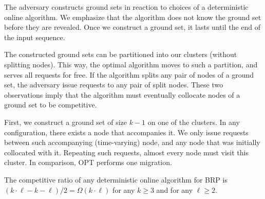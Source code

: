 \documentclass[manuscript,screen=true, review, anonymous]{acmart}
\newcommand{\OPT}{\textsf{OPT}\xspace}
\newcommand{\OBRP}{BRP}
\begin{document}
The adversary constructs ground sets in reaction to choices of a deterministic online algorithm.
We emphasize that the algorithm does not know the ground set before they are revealed.
Once we construct a ground set, it lasts until the end of the input sequence.

The constructed ground sets can be partitioned into our clusters (without splitting nodes).
This way, the optimal algorithm moves to such a partition, and serves all requests for free.
If the algorithm splits any pair of nodes of a ground set, the adversary issue requests to any pair of split nodes.
These two observations imply that the algorithm must eventually collocate nodes of a ground set to be competitive.

First, we construct a ground set of size $k-1$ on one of the clusters.
In any configuration, there exists a node that accompanies it.
We only issue requests between such accompanying (time-varying) node, and any node that was initially collocated with it.
Repeating such requests, almost every node must visit this cluster.
In comparison, \OPT performs one migration.

\begin{theorem}
	\label{th:lowerbound}
	The competitive ratio of any deterministic online algorithm for \OBRP{} is  $(k \cdot \ell - k - \ell) / 2 = \Omega(k\cdot \ell)$ for any $k\geq 3$ and for any $\ell \geq 2$.
\end{theorem}
\end{document}
